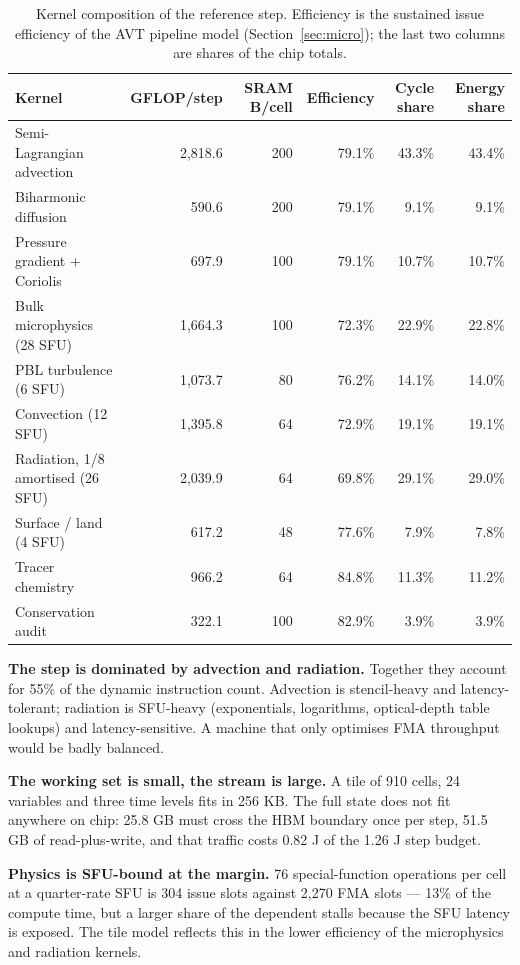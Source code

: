 \begin{table}[t]
\centering\small
\caption{Kernel composition of the reference step. Efficiency is the sustained issue efficiency of
the AVT pipeline model (Section~\ref{sec:micro}); the last two columns are shares of the chip
totals.}
\label{tab:kernels}
\begin{tabular}{@{}lrrrrr@{}}
\toprule
Kernel & GFLOP/step & SRAM B/cell & Efficiency & Cycle share & Energy share\\
\midrule
Semi-Lagrangian advection & 2,818.6 & 200 & 79.1\% & 43.3\% & 43.4\%\\
Biharmonic diffusion & 590.6 & 200 & 79.1\% & 9.1\% & 9.1\%\\
Pressure gradient + Coriolis & 697.9 & 100 & 79.1\% & 10.7\% & 10.7\%\\
Bulk microphysics (28 SFU) & 1,664.3 & 100 & 72.3\% & 22.9\% & 22.8\%\\
PBL turbulence (6 SFU) & 1,073.7 & 80 & 76.2\% & 14.1\% & 14.0\%\\
Convection (12 SFU) & 1,395.8 & 64 & 72.9\% & 19.1\% & 19.1\%\\
Radiation, 1/8 amortised (26 SFU) & 2,039.9 & 64 & 69.8\% & 29.1\% & 29.0\%\\
Surface / land (4 SFU) & 617.2 & 48 & 77.6\% & 7.9\% & 7.8\%\\
Tracer chemistry & 966.2 & 64 & 84.8\% & 11.3\% & 11.2\%\\
Conservation audit & 322.1 & 100 & 82.9\% & 3.9\% & 3.9\%\\
\bottomrule
\end{tabular}
\end{table}

\textbf{The step is dominated by advection and radiation.} Together they account for 55\% of the
dynamic instruction count. Advection is stencil-heavy and latency-tolerant; radiation is
SFU-heavy (exponentials, logarithms, optical-depth table lookups) and latency-sensitive. A machine
that only optimises FMA throughput would be badly balanced.

\textbf{The working set is small, the stream is large.} A tile of 910 cells, 24 variables and three
time levels fits in 256 KB. The full state does not fit anywhere on chip: 25.8 GB must cross the
HBM boundary once per step, 51.5 GB of read-plus-write, and that traffic costs 0.82 J of the
1.26 J step budget.

\textbf{Physics is SFU-bound at the margin.} 76 special-function operations per cell at a
quarter-rate SFU is 304 issue slots against 2,270 FMA slots --- 13\% of the compute time, but a
larger share of the dependent stalls because the SFU latency is exposed. The tile model reflects
this in the lower efficiency of the microphysics and radiation kernels.


